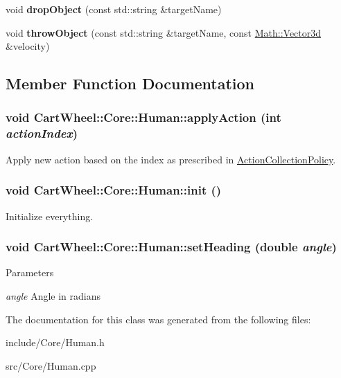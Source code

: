 \begin{DoxyCompactItemize}
\item 
\hypertarget{classCartWheel_1_1Core_1_1Human_a73364958c5eb357d04f0871c8dfb2dc8}{
void {\bfseries dropObject} (const std::string \&targetName)}
\label{classCartWheel_1_1Core_1_1Human_a73364958c5eb357d04f0871c8dfb2dc8}

\item 
\hypertarget{classCartWheel_1_1Core_1_1Human_a9c6bf3731f008909399f85a997845cbc}{
void {\bfseries throwObject} (const std::string \&targetName, const \hyperlink{classCartWheel_1_1Math_1_1Vector3d}{Math::Vector3d} \&velocity)}
\label{classCartWheel_1_1Core_1_1Human_a9c6bf3731f008909399f85a997845cbc}

\end{DoxyCompactItemize}


\subsection{Member Function Documentation}
\hypertarget{classCartWheel_1_1Core_1_1Human_a96af09af6db72efc7fe1582f1721980c}{
\subsubsection[{applyAction}]{\setlength{\rightskip}{0pt plus 5cm}void CartWheel::Core::Human::applyAction (int {\em actionIndex})}}
\label{classCartWheel_1_1Core_1_1Human_a96af09af6db72efc7fe1582f1721980c}
Apply new action based on the index as prescribed in \hyperlink{classCartWheel_1_1Core_1_1ActionCollectionPolicy}{ActionCollectionPolicy}. \hypertarget{classCartWheel_1_1Core_1_1Human_a67285fc71a5c3f07a24a268e796bb3f2}{
\subsubsection[{init}]{\setlength{\rightskip}{0pt plus 5cm}void CartWheel::Core::Human::init ()}}
\label{classCartWheel_1_1Core_1_1Human_a67285fc71a5c3f07a24a268e796bb3f2}
Initialize everything. \hypertarget{classCartWheel_1_1Core_1_1Human_a3b99b7ad3f4e6a211093f21250a5b5bf}{
\subsubsection[{setHeading}]{\setlength{\rightskip}{0pt plus 5cm}void CartWheel::Core::Human::setHeading (double {\em angle})}}
\label{classCartWheel_1_1Core_1_1Human_a3b99b7ad3f4e6a211093f21250a5b5bf}

\begin{DoxyParams}{Parameters}
\item[{\em angle}]Angle in radians \end{DoxyParams}


The documentation for this class was generated from the following files:\begin{DoxyCompactItemize}
\item 
include/Core/Human.h\item 
src/Core/Human.cpp\end{DoxyCompactItemize}
